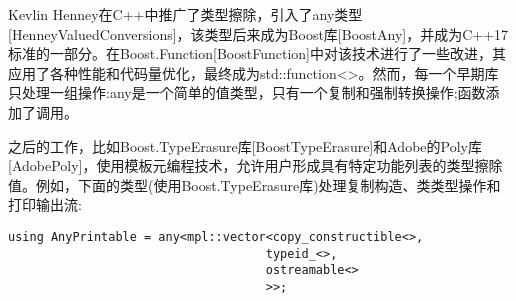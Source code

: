 Kevlin Henney在C++中推广了类型擦除，引入了any类型[HenneyValuedConversions]，该类型后来成为Boost库[BoostAny]，并成为C++17标准的一部分。在Boost.Function[BoostFunction]中对该技术进行了一些改进，其应用了各种性能和代码量优化，最终成为std::function<>。然而，每一个早期库只处理一组操作:any是一个简单的值类型，只有一个复制和强制转换操作;函数添加了调用。

之后的工作，比如Boost.TypeErasure库[BoostTypeErasure]和Adobe的Poly库[AdobePoly]，使用模板元编程技术，允许用户形成具有特定功能列表的类型擦除值。例如，下面的类型(使用Boost.TypeErasure库)处理复制构造、类类型操作和打印输出流:

\begin{lstlisting}[style=styleCXX]
using AnyPrintable = any<mpl::vector<copy_constructible<>,
									typeid_<>,
									ostreamable<>
									>>;
\end{lstlisting}